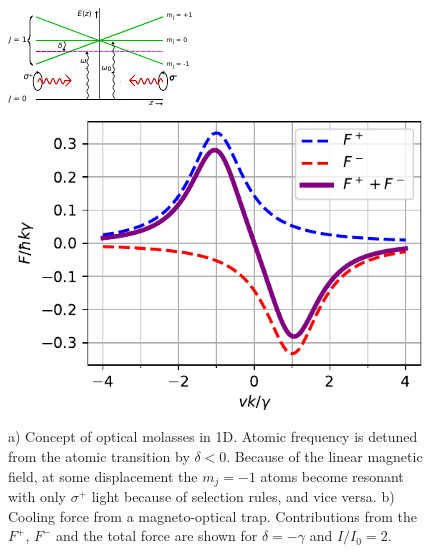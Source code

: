 \begin{figure}
\centering
	\begin{minipage}{.49\textwidth}
		\centering
		\includegraphics[width=\linewidth]{figures/OpticalMolasses.pdf}
	\end{minipage}
	\begin{minipage}{.48\textwidth}
		\centering
		\includegraphics[width=\linewidth]{figures/MOTplot.pdf}
	\end{minipage}
	\caption{a) Concept of optical molasses in 1D. Atomic frequency is detuned from the atomic transition by $\delta<0$. Because of the linear magnetic field, at some displacement the $m_j=-1$ atoms become resonant with only $\sigma^+$ light because of selection rules, and vice versa. b) Cooling force from a magneto-optical trap. Contributions from the $F^+$, $F^-$ and the total force are shown for $\delta = -\gamma$ and $I/I_0 = 2.$}
		\label{fig:MOTdamping}
\end{figure}

